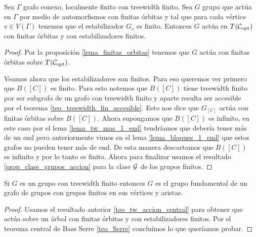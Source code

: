 \documentclass[tesis.tex]{subfiles}
\begin{document}
\begin{teo}\label{teo_tw_accion_central}
	Sea $\Gamma$ grafo conexo, localmente finito con treewidth finito.
	Sea $G$ grupo que actúa en $\Gamma$ por medio de automorfismos con finitas órbitas y tal que para cada vértice $v \in V(\Gamma)$ tenemos que el estabilizador $G_{v}$ es finito.
	Entonces $G$ actúa en $T({\cal C}_{\text{opt}})$ con finitas órbitas y con estabilizadores finitos.
\end{teo}
\begin{proof}
	Por la proposición \ref{lema_finitas_orbitas} tenemos que $G$ actúa con finitas órbitas sobre $T({\cal C}_{\text{opt}})$.
	
	Veamos ahora que los estabilizadores son finitos.
	Para eso queremos ver primero que $B([C])$ es finito.
	Para esto notemos que $B([C])$ tiene treewidth finito por ser subgrafo de un grafo con treewidth finito y aparte resulta ser accesible por el teorema \ref{teo_treewidth_fin_accesible}.
	Esto nos dice que $G_{[C]}$ actúa con finitas órbitas sobre $B([C])$.
	Ahora supongamos que $B([C])$ es infinito, en este caso por el lema \ref{lema_tw_mas_1_end} tendríamos que debería tener más de un end pero anteriormente vimos en el lema \ref{lema_bloques_1_end} que estos grafos no pueden tener más de end.
	De esta manera descartamos que $B([C])$ es infinito y por lo tanto es finito.
	Ahora para finalizar usamos el resultado \ref{prop_clase_grupos_accion} para la clase ${\cal G}$ de los grupos finitos.
\end{proof}



\begin{coro}\label{coro_tw_finito_implica_pi1}
	Si $G$ es un grupo con treewidth finito entonces $G$ es el grupo fundamental de un grafo de grupos con grupos finitos en sus vértices y aristas.
\end{coro}
\begin{proof}
	Usamos el resultado anterior \ref{teo_tw_accion_central} para obtener que actúa sobre un árbol con finitas órbitas y con estabilizadores finitos.
	Por el teorema central de Bass Serre \ref{teo_Serre} concluímos lo que queríamos probar.
\end{proof}



\listoftodos
\end{document}

